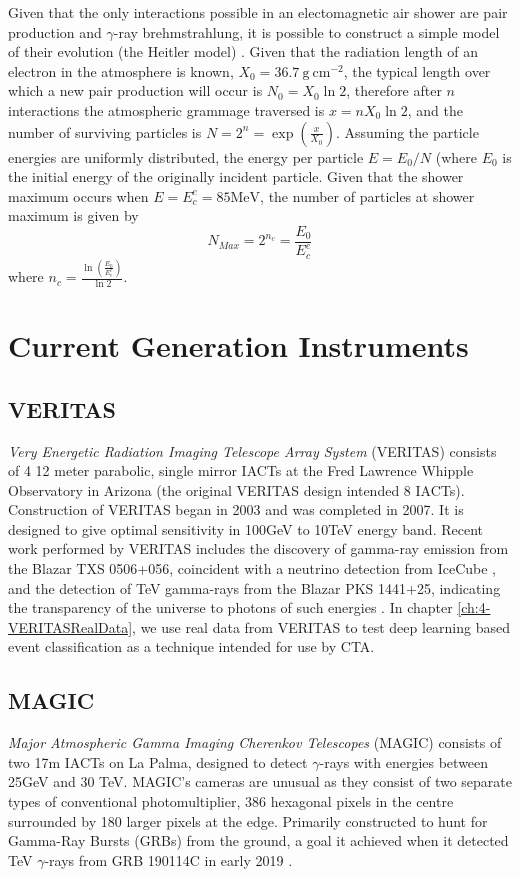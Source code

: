 Given that the only interactions possible in an electomagnetic air shower are pair production and $\gamma$-ray brehmstrahlung, it is possible to construct a simple model of their evolution (the Heitler model) \cite{heitler}. Given that the radiation length of an electron in the atmosphere is known, $X_0=\mathrm{36.7\ g\ cm^{-2}}$, the typical length over which a new pair production will occur is $N_0=X_0 \ln 2$, therefore after $n$ interactions the atmospheric grammage traversed is $x=nX_0 \ln 2$, and the number of surviving particles is $N=2^n=\exp \left( \frac{x}{X_0}\right)$. Assuming the particle energies are uniformly distributed, the energy per particle $E=E_0/N$ (where $E_0$ is the initial energy of the originally incident particle. Given that the shower maximum occurs when $E=E_c^e=\mathrm{85 MeV}$, the number of particles at shower maximum is given by 
\begin{equation}
    N_{Max}=2^{n_c}=\frac{E_0}{E_c^e}
\end{equation}
where $n_c=\frac{\ln (\frac{E_0}{E_e^c})}{\ln 2}$.
\section{Current Generation Instruments}
\subsection{VERITAS}
\textit{Very Energetic Radiation Imaging Telescope Array System} (VERITAS) consists of 4 12 meter parabolic, single mirror IACTs at the Fred Lawrence Whipple Observatory in Arizona (the original VERITAS design intended 8 IACTs). Construction of VERITAS began in 2003 and was completed in 2007. It is designed to give optimal sensitivity in 100GeV to 10TeV energy band. Recent work performed by VERITAS includes the discovery of gamma-ray emission from the Blazar TXS 0506+056, coincident with a neutrino detection from IceCube \cite{TXS}, and the detection of TeV gamma-rays from the Blazar PKS 1441+25, indicating the transparency of the universe to photons of such energies \cite{escape}. In chapter \ref{ch:4-VERITASRealData}, we use real data from VERITAS to test deep learning based event classification as a technique intended for use by CTA.

\subsection{MAGIC}
\textit{Major Atmospheric Gamma Imaging Cherenkov Telescopes} (MAGIC) consists of two 17m IACTs on La Palma, designed to detect $\gamma$-rays with energies between 25GeV and 30 TeV. MAGIC's cameras are unusual as they consist of two separate types of conventional photomultiplier, 386 hexagonal pixels in the centre surrounded by 180 larger pixels at the edge. Primarily constructed to hunt for Gamma-Ray Bursts (GRBs) from the ground, a goal it achieved when it detected TeV $\gamma$-rays from GRB 190114C in early 2019 \cite{magicGRB}.
